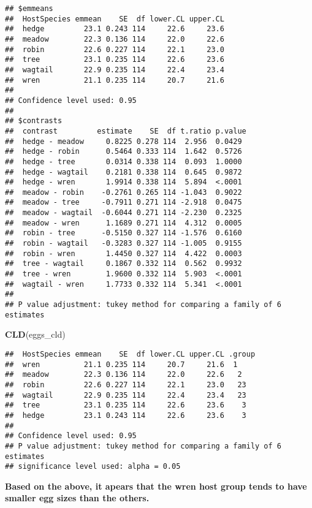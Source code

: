 \documentclass[]{article}
\newenvironment{Shaded}{\begin{snugshade}}{\end{snugshade}}
\newcommand{\KeywordTok}[1]{\textcolor[rgb]{0.13,0.29,0.53}{\textbf{#1}}}
\newcommand{\NormalTok}[1]{#1}
\begin{document}
\begin{verbatim}
## $emmeans
##  HostSpecies emmean    SE  df lower.CL upper.CL
##  hedge         23.1 0.243 114     22.6     23.6
##  meadow        22.3 0.136 114     22.0     22.6
##  robin         22.6 0.227 114     22.1     23.0
##  tree          23.1 0.235 114     22.6     23.6
##  wagtail       22.9 0.235 114     22.4     23.4
##  wren          21.1 0.235 114     20.7     21.6
## 
## Confidence level used: 0.95 
## 
## $contrasts
##  contrast         estimate    SE  df t.ratio p.value
##  hedge - meadow     0.8225 0.278 114  2.956  0.0429 
##  hedge - robin      0.5464 0.333 114  1.642  0.5726 
##  hedge - tree       0.0314 0.338 114  0.093  1.0000 
##  hedge - wagtail    0.2181 0.338 114  0.645  0.9872 
##  hedge - wren       1.9914 0.338 114  5.894  <.0001 
##  meadow - robin    -0.2761 0.265 114 -1.043  0.9022 
##  meadow - tree     -0.7911 0.271 114 -2.918  0.0475 
##  meadow - wagtail  -0.6044 0.271 114 -2.230  0.2325 
##  meadow - wren      1.1689 0.271 114  4.312  0.0005 
##  robin - tree      -0.5150 0.327 114 -1.576  0.6160 
##  robin - wagtail   -0.3283 0.327 114 -1.005  0.9155 
##  robin - wren       1.4450 0.327 114  4.422  0.0003 
##  tree - wagtail     0.1867 0.332 114  0.562  0.9932 
##  tree - wren        1.9600 0.332 114  5.903  <.0001 
##  wagtail - wren     1.7733 0.332 114  5.341  <.0001 
## 
## P value adjustment: tukey method for comparing a family of 6 estimates
\end{verbatim}

\begin{Shaded}
\begin{Highlighting}[]
\KeywordTok{CLD}\NormalTok{(eggs_cld)}
\end{Highlighting}
\end{Shaded}

\begin{verbatim}
##  HostSpecies emmean    SE  df lower.CL upper.CL .group
##  wren          21.1 0.235 114     20.7     21.6  1    
##  meadow        22.3 0.136 114     22.0     22.6   2   
##  robin         22.6 0.227 114     22.1     23.0   23  
##  wagtail       22.9 0.235 114     22.4     23.4   23  
##  tree          23.1 0.235 114     22.6     23.6    3  
##  hedge         23.1 0.243 114     22.6     23.6    3  
## 
## Confidence level used: 0.95 
## P value adjustment: tukey method for comparing a family of 6 estimates 
## significance level used: alpha = 0.05
\end{verbatim}

\textbf{Based on the above, it apears that the wren host group tends to
have smaller egg sizes than the others.}
\end{document}
